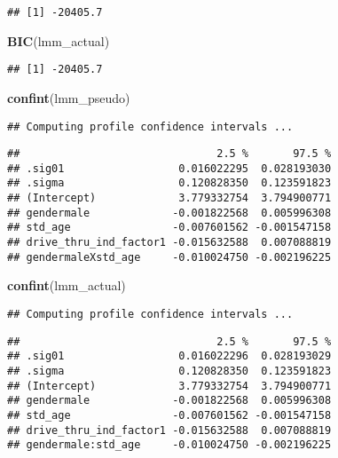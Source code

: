 \documentclass[
]{article}
\newenvironment{Shaded}{\begin{snugshade}}{\end{snugshade}}
\newcommand{\FunctionTok}[1]{\textcolor[rgb]{0.13,0.29,0.53}{\textbf{#1}}}
\newcommand{\NormalTok}[1]{#1}
\begin{document}
\begin{verbatim}
## [1] -20405.7
\end{verbatim}

\begin{Shaded}
\begin{Highlighting}[]
\FunctionTok{BIC}\NormalTok{(lmm\_actual)}
\end{Highlighting}
\end{Shaded}

\begin{verbatim}
## [1] -20405.7
\end{verbatim}

\begin{Shaded}
\begin{Highlighting}[]
\FunctionTok{confint}\NormalTok{(lmm\_pseudo)}
\end{Highlighting}
\end{Shaded}

\begin{verbatim}
## Computing profile confidence intervals ...
\end{verbatim}

\begin{verbatim}
##                               2.5 %       97.5 %
## .sig01                  0.016022295  0.028193030
## .sigma                  0.120828350  0.123591823
## (Intercept)             3.779332754  3.794900771
## gendermale             -0.001822568  0.005996308
## std_age                -0.007601562 -0.001547158
## drive_thru_ind_factor1 -0.015632588  0.007088819
## gendermaleXstd_age     -0.010024750 -0.002196225
\end{verbatim}

\begin{Shaded}
\begin{Highlighting}[]
\FunctionTok{confint}\NormalTok{(lmm\_actual)}
\end{Highlighting}
\end{Shaded}

\begin{verbatim}
## Computing profile confidence intervals ...
\end{verbatim}

\begin{verbatim}
##                               2.5 %       97.5 %
## .sig01                  0.016022296  0.028193029
## .sigma                  0.120828350  0.123591823
## (Intercept)             3.779332754  3.794900771
## gendermale             -0.001822568  0.005996308
## std_age                -0.007601562 -0.001547158
## drive_thru_ind_factor1 -0.015632588  0.007088819
## gendermale:std_age     -0.010024750 -0.002196225
\end{verbatim}
\end{document}

